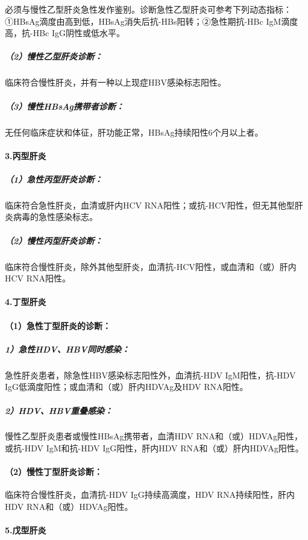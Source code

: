 必须与慢性乙型肝炎急性发作鉴别。诊断急性乙型肝炎可参考下列动态指标：①HBsAg滴度由高到低，HBsAg消失后抗-HBs阳转；②急性期抗-HBc
IgM滴度高，抗-HBc IgG阴性或低水平。

\subparagraph{（2）慢性乙型肝炎诊断：}

临床符合慢性肝炎，并有一种以上现症HBV感染标志阳性。

\subparagraph{（3）慢性HBsAg携带者诊断：}

无任何临床症状和体征，肝功能正常，HBsAg持续阳性6个月以上者。

\paragraph{3.丙型肝炎}

\subparagraph{（1）急性丙型肝炎诊断：}

临床符合急性肝炎，血清或肝内HCV
RNA阳性；或抗-HCV阳性，但无其他型肝炎病毒的急性感染标志。

\subparagraph{（2）慢性丙型肝炎诊断：}

临床符合慢性肝炎，除外其他型肝炎，血清抗-HCV阳性，或血清和（或）肝内HCV
RNA阳性。

\paragraph{4.丁型肝炎}

\paragraph{（1）急性丁型肝炎的诊断：}

\subparagraph{1）急性HDV、HBV同时感染：}

急性肝炎患者，除急性HBV感染标志阳性外，血清抗-HDV IgM阳性，抗-HDV
IgG低滴度阳性；或血清和（或）肝内HDVAg及HDV RNA阳性。

\subparagraph{2）HDV、HBV重叠感染：}

慢性乙型肝炎患者或慢性HBsAg携带者，血清HDV
RNA和（或）HDVAg阳性，或抗-HDV IgM和抗-HDV IgG阳性，肝内HDV
RNA和（或）肝内HDVAg阳性。

\paragraph{（2）慢性丁型肝炎诊断：}

临床符合慢性肝炎，血清抗-HDV IgG持续高滴度，HDV RNA持续阳性，肝内HDV
RNA和（或）HDVAg阳性。

\paragraph{5.戊型肝炎}

